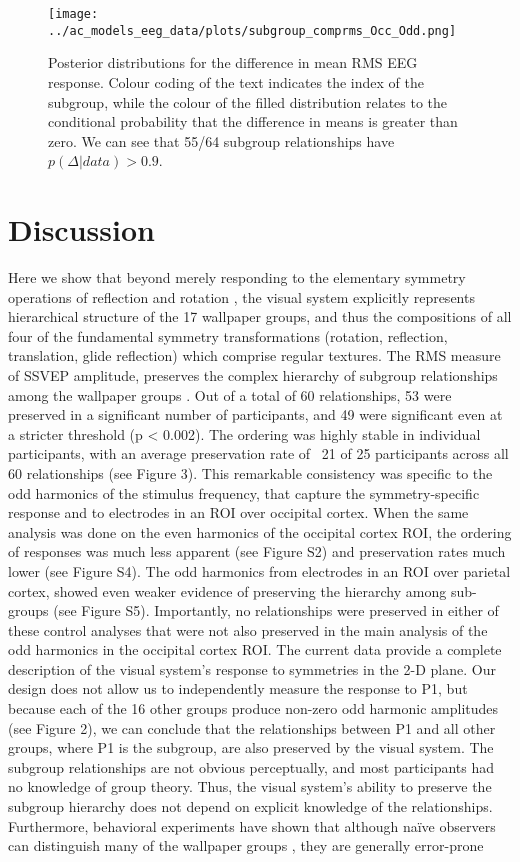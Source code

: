 \documentclass[9pt,twocolumn,twoside,lineno]{pnas-new}
\begin{document}
\begin{figure}%
\centering
\texttt{[image: ../ac\_models\_eeg\_data/plots/subgroup\_comprms\_Occ\_Odd.png]}
\caption{Posterior distributions for the difference in mean RMS EEG response. Colour coding of the text indicates the index of the subgroup, while the colour of the filled distribution relates to the conditional probability that the difference in means is greater than zero. We can see that 55/64 subgroup relationships have $p(\Delta|data)>0.9$.}
\label{fig:durations_rotations}
\end{figure}

\section*{Discussion}

Here we show that beyond merely responding to the elementary symmetry operations of reflection \cite{RN1170} and rotation \cite{RN1725}, the visual system explicitly represents hierarchical structure of the 17 wallpaper groups, and thus the compositions of all four of the fundamental symmetry transformations (rotation, reflection, translation, glide reflection) which comprise regular textures. The RMS measure of SSVEP amplitude, preserves the complex hierarchy of subgroup relationships among the wallpaper groups \cite{RN1711}. Out of a total of 60 relationships, 53 were preserved in a significant number of participants, and 49 were significant even at a stricter threshold (p < 0.002). The ordering was highly stable in individual participants, with an average preservation rate of ~21 of 25 participants across all 60 relationships (see Figure 3). This remarkable consistency was specific to the odd harmonics of the stimulus frequency, that capture the symmetry-specific response \cite{RN1725} and to electrodes in an ROI over occipital cortex. When the same analysis was done on the even harmonics of the occipital cortex ROI, the ordering of responses was much less apparent (see Figure S2) and preservation rates much lower (see Figure S4). The odd harmonics from electrodes in an ROI over parietal cortex, showed even weaker evidence of preserving the hierarchy among sub-groups (see Figure S5). Importantly, no relationships were preserved in either of these control analyses that were not also preserved in the main analysis of the odd harmonics in the occipital cortex ROI. The current data provide a complete description of the visual system’s response to symmetries in the 2-D plane. Our design does not allow us to independently measure the response to P1, but because each of the 16 other groups produce non-zero odd harmonic amplitudes (see Figure 2), we can conclude that the relationships between P1 and all other groups, where P1 is the subgroup, are also preserved by the visual system. The subgroup relationships are not obvious perceptually, and most participants had no knowledge of group theory. Thus, the visual system’s ability to preserve the subgroup hierarchy does not depend on explicit knowledge of the relationships. Furthermore, behavioral experiments have shown that although naïve observers can distinguish many of the wallpaper groups \cite{RN1253}, they are generally error-prone 
\end{document}
